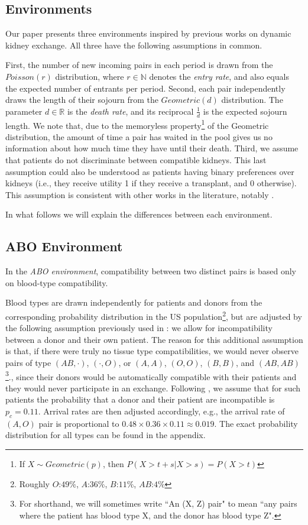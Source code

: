\subsection{Environments}

Our paper presents three environments inspired by previous works on dynamic kidney exchange. All three have the following assumptions in common. 

First, the number of new incoming pairs in each period is drawn from the $Poisson(r)$ distribution, where $r \in \mathbb{N}$ denotes the \emph{entry rate}, and also equals the expected number of entrants per period. Second, each pair independently draws the length of their sojourn from the $Geometric(d)$ distribution. The parameter $d \in \mathbb{R}$ is the \emph{death rate}, and its reciprocal $\frac{1}{d}$ is the expected sojourn length. We note that, due to the memoryless property\footnote{If $X \sim Geometric(p)$, then $P(X > t+s | X > s) = P(X > t)$} of the Geometric distribution, the amount of time a pair has waited in the pool gives us no information about how much time they have until their death. Third, we assume that patients do not discriminate between compatible kidneys. This last assumption could also be understood as patients having binary preferences over kidneys (i.e., they receive utility 1 if they receive a transplant, and 0 otherwise). This assumption is consistent with other works in the literature, notably \cite{roth2005pairwise}.

In what follows we will explain the differences between each environment.


\subsection{ABO Environment}

In the \emph{ABO environment}, compatibility between two distinct pairs is based only on blood-type compatibility. 

Blood types are drawn independently for patients and donors from the corresponding probability distribution in the US population\footnote{Roughly $O$:$49\%$, $A$:$36\%$, $B$:$11\%$, $AB$:$4\%$}, but are adjusted by the following assumption previously used in \citet{unver2010dynamic}: we allow for incompatibility between a donor and their own patient. The reason for this additional assumption is that, if there were truly no tissue type compatibilities, we would never observe pairs of type $(AB,\cdot)$, $(\cdot, O)$, or $(A,A)$, $(O,O)$, $(B,B)$, and $(AB,AB)$\footnote{For shorthand, we will sometimes write ``An (X, Z) pair" to mean ``any pairs where the patient has blood type X, and the donor has blood type Z".}., since their donors would be automatically compatible with their patients and they would never participate in an exchange. Following \citet{zenios2001primum}, we assume that for such patients the probability that a donor and their patient are incompatible is $p_c = 0.11$. Arrival rates are then adjusted accordingly, e.g., the arrival rate of $(A,O)$ pair is proportional to $0.48 \times 0.36 \times 0.11 \approx 0.019$. The exact probability distribution for all types can be found in the appendix.

